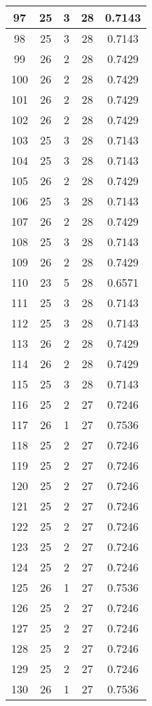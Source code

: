 \documentclass[letterpaper, 12pt]{article}
\begin{document}
\begin{longtable}{|c|c|c|c|c|}
\hline
97 & 25 & 3 & 28 & 0.7143 \\
\hline
98 & 25 & 3 & 28 & 0.7143 \\
\hline
99 & 26 & 2 & 28 & 0.7429 \\
\hline
100 & 26 & 2 & 28 & 0.7429 \\
\hline
101 & 26 & 2 & 28 & 0.7429 \\
\hline
102 & 26 & 2 & 28 & 0.7429 \\
\hline
103 & 25 & 3 & 28 & 0.7143 \\
\hline
104 & 25 & 3 & 28 & 0.7143 \\
\hline
105 & 26 & 2 & 28 & 0.7429 \\
\hline
106 & 25 & 3 & 28 & 0.7143 \\
\hline
107 & 26 & 2 & 28 & 0.7429 \\
\hline
108 & 25 & 3 & 28 & 0.7143 \\
\hline
109 & 26 & 2 & 28 & 0.7429 \\
\hline
110 & 23 & 5 & 28 & 0.6571 \\
\hline
111 & 25 & 3 & 28 & 0.7143 \\
\hline
112 & 25 & 3 & 28 & 0.7143 \\
\hline
113 & 26 & 2 & 28 & 0.7429 \\
\hline
114 & 26 & 2 & 28 & 0.7429 \\
\hline
115 & 25 & 3 & 28 & 0.7143 \\
\hline
116 & 25 & 2 & 27 & 0.7246 \\
\hline
117 & 26 & 1 & 27 & 0.7536 \\
\hline
118 & 25 & 2 & 27 & 0.7246 \\
\hline
119 & 25 & 2 & 27 & 0.7246 \\
\hline
120 & 25 & 2 & 27 & 0.7246 \\
\hline
121 & 25 & 2 & 27 & 0.7246 \\
\hline
122 & 25 & 2 & 27 & 0.7246 \\
\hline
123 & 25 & 2 & 27 & 0.7246 \\
\hline
124 & 25 & 2 & 27 & 0.7246 \\
\hline
125 & 26 & 1 & 27 & 0.7536 \\
\hline
126 & 25 & 2 & 27 & 0.7246 \\
\hline
127 & 25 & 2 & 27 & 0.7246 \\
\hline
128 & 25 & 2 & 27 & 0.7246 \\
\hline
129 & 25 & 2 & 27 & 0.7246 \\
\hline
130 & 26 & 1 & 27 & 0.7536 \\

\end{longtable}
\end{document}
